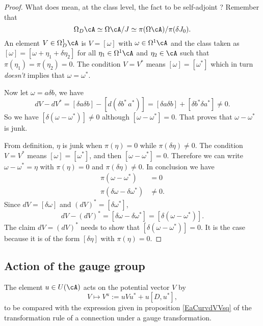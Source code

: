 \begin{proof}
What does mean, at the class level, the fact to be self-adjoint ? Remember that
\[ 
  \Omega_D\cA\simeq \Omega\cA/J\simeq\pi(\Omega\cA)/\pi(\delta J_0).
\]
An element $V\in\Omega_D^1\cA$ is $V=[\omega]$ with $\omega\in\Omega^1\cA$ and the class taken as $[\omega]=[\omega+\eta_1+\delta\eta_2]$ for all $\eta_1\in\Omega^1\cA$ and $\eta_2\in\cA$ such that $\pi(\eta_1)=\pi(\eta_2)=0$. The condition $V=V^*$ means $[\omega]=[\omega^*]$ which in turn \emph{doesn't} implies that $\omega=\omega^*$.

Now let $\omega=a\delta b$, we have 
\[ 
dV-dV^*=[\delta a\delta b]-[d(\delta b^*\, a^*)]
		=[\delta a\delta b]+[\delta b^*\delta a^*]\neq 0.
\]
So we have $[\delta(\omega-\omega^*)]\neq 0$ although $[\omega-\omega^*]=0$. That proves that $\omega-\omega^*$ is junk.

From definition, $\eta$ is junk when $\pi(\eta)=0$ while $\pi(\delta\eta)\neq 0$. The condition $V=V^*$ means $[\omega]=[\omega^*]$, and then $[\omega-\omega^*]=0$. Therefore we can write $\omega-\omega^*=\eta$ with $\pi(\eta)=0$ and $\pi(\delta\eta)\neq 0$. In conclusion we have
\begin{subequations}
\begin{align}
  \pi(\omega-\omega^*)&=0\\
	\pi(\delta\omega-\delta\omega^*)&\neq 0.
\end{align}
\end{subequations}
Since $dV=[\delta\omega]$ and $(dV)^*=[\delta\omega^*]$, 
\[
dV-(dV)^*=[\delta\omega-\delta\omega^*]
		=[\delta(\omega-\omega^*)].
\]
The claim $dV=(dV)^*$ needs to show that $[\delta(\omega-\omega^*)]=0$. It is the case because it is of the form $[\delta\eta]$ with $\pi(\eta)=0$.

\end{proof}


\subsection{Action of the gauge group}

The element $u\in U(\cA)$ acts on the potential vector $V$ by
\begin{equation}	\label{EqDefActGaugePotVec}
  V\mapsto V^{u}:=uVu^*+u[D,u^*],
\end{equation}
to be compared with the expression given in proposition \eqref{EaCurvdVVsq} of the transformation rule of a connection under a gauge transformation.
 
